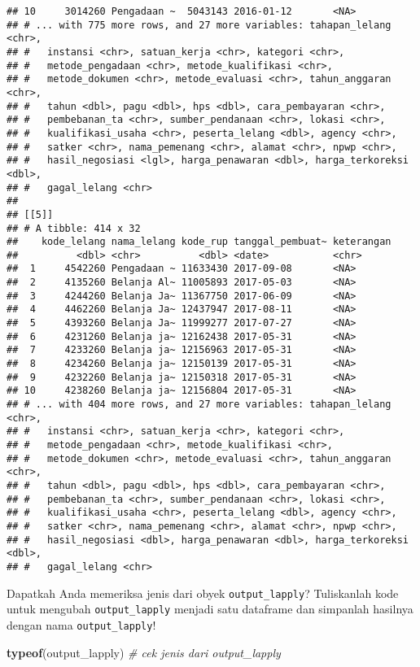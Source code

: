 \documentclass[]{article}
\newenvironment{Shaded}{\begin{snugshade}}{\end{snugshade}}
\newcommand{\CommentTok}[1]{\textcolor[rgb]{0.56,0.35,0.01}{\textit{#1}}}
\newcommand{\KeywordTok}[1]{\textcolor[rgb]{0.13,0.29,0.53}{\textbf{#1}}}
\newcommand{\NormalTok}[1]{#1}
\begin{document}
\begin{verbatim}
## 10     3014260 Pengadaan ~  5043143 2016-01-12       <NA>      
## # ... with 775 more rows, and 27 more variables: tahapan_lelang <chr>,
## #   instansi <chr>, satuan_kerja <chr>, kategori <chr>,
## #   metode_pengadaan <chr>, metode_kualifikasi <chr>,
## #   metode_dokumen <chr>, metode_evaluasi <chr>, tahun_anggaran <chr>,
## #   tahun <dbl>, pagu <dbl>, hps <dbl>, cara_pembayaran <chr>,
## #   pembebanan_ta <chr>, sumber_pendanaan <chr>, lokasi <chr>,
## #   kualifikasi_usaha <chr>, peserta_lelang <dbl>, agency <chr>,
## #   satker <chr>, nama_pemenang <chr>, alamat <chr>, npwp <chr>,
## #   hasil_negosiasi <lgl>, harga_penawaran <dbl>, harga_terkoreksi <dbl>,
## #   gagal_lelang <chr>
## 
## [[5]]
## # A tibble: 414 x 32
##    kode_lelang nama_lelang kode_rup tanggal_pembuat~ keterangan
##          <dbl> <chr>          <dbl> <date>           <chr>     
##  1     4542260 Pengadaan ~ 11633430 2017-09-08       <NA>      
##  2     4135260 Belanja Al~ 11005893 2017-05-03       <NA>      
##  3     4244260 Belanja Ja~ 11367750 2017-06-09       <NA>      
##  4     4462260 Belanja Ja~ 12437947 2017-08-11       <NA>      
##  5     4393260 Belanja Ja~ 11999277 2017-07-27       <NA>      
##  6     4231260 Belanja ja~ 12162438 2017-05-31       <NA>      
##  7     4233260 Belanja ja~ 12156963 2017-05-31       <NA>      
##  8     4234260 Belanja ja~ 12150139 2017-05-31       <NA>      
##  9     4232260 Belanja ja~ 12150318 2017-05-31       <NA>      
## 10     4238260 Belanja ja~ 12156804 2017-05-31       <NA>      
## # ... with 404 more rows, and 27 more variables: tahapan_lelang <chr>,
## #   instansi <chr>, satuan_kerja <chr>, kategori <chr>,
## #   metode_pengadaan <chr>, metode_kualifikasi <chr>,
## #   metode_dokumen <chr>, metode_evaluasi <chr>, tahun_anggaran <chr>,
## #   tahun <dbl>, pagu <dbl>, hps <dbl>, cara_pembayaran <chr>,
## #   pembebanan_ta <chr>, sumber_pendanaan <chr>, lokasi <chr>,
## #   kualifikasi_usaha <chr>, peserta_lelang <dbl>, agency <chr>,
## #   satker <chr>, nama_pemenang <chr>, alamat <chr>, npwp <chr>,
## #   hasil_negosiasi <dbl>, harga_penawaran <dbl>, harga_terkoreksi <dbl>,
## #   gagal_lelang <chr>
\end{verbatim}

Dapatkah Anda memeriksa jenis dari obyek \texttt{output\_lapply}?
Tuliskanlah kode untuk mengubah \texttt{output\_lapply} menjadi satu
dataframe dan simpanlah hasilnya dengan nama \texttt{output\_lapply}!

\begin{Shaded}
\begin{Highlighting}[]
\KeywordTok{typeof}\NormalTok{(output_lapply) }\CommentTok{# cek jenis dari output_lapply}
\end{Highlighting}
\end{Shaded}
\end{document}
